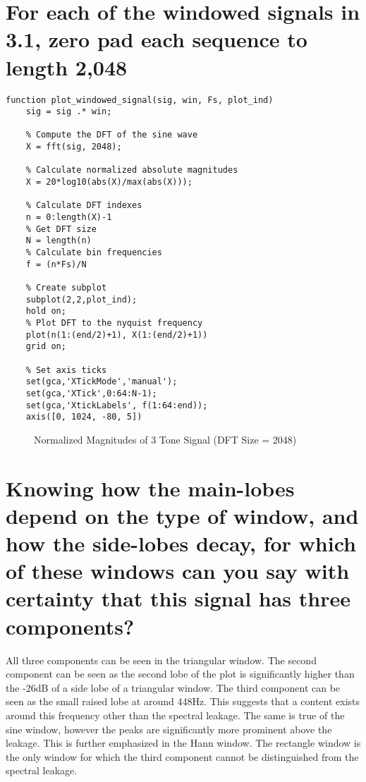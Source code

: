 \documentclass[titlepage]{scrartcl}
\begin{document}
\section{For each of the windowed signals in 3.1, zero pad each sequence to
length 2,048}
\begin{lstlisting}
function plot_windowed_signal(sig, win, Fs, plot_ind)
    sig = sig .* win;
    
    % Compute the DFT of the sine wave
    X = fft(sig, 2048);

    % Calculate normalized absolute magnitudes
    X = 20*log10(abs(X)/max(abs(X)));

    % Calculate DFT indexes
    n = 0:length(X)-1
    % Get DFT size
    N = length(n)
    % Calculate bin frequencies
    f = (n*Fs)/N

    % Create subplot
    subplot(2,2,plot_ind);
    hold on;
    % Plot DFT to the nyquist frequency
    plot(n(1:(end/2)+1), X(1:(end/2)+1))
    grid on;

    % Set axis ticks
    set(gca,'XTickMode','manual');
    set(gca,'XTick',0:64:N-1);
    set(gca,'XtickLabels', f(1:64:end));
    axis([0, 1024, -80, 5])
\end{lstlisting}

\begin{figure}[H]
    \caption{Normalized Magnitudes of 3 Tone Signal (DFT Size = 2048)}
    \label{WindowedSigDFT2048}
\end{figure}

\section{Knowing how the main-lobes depend on the type of window, and how
the side-lobes decay, for which of these windows can you say with
certainty that this signal has three components?}
All three components can be seen in the triangular window. The second component
can be seen as the second lobe of the plot is significantly higher than the
-26dB of a side lobe of a triangular window. The third component can be seen as
the small raised lobe at around 448Hz. This suggests that a content exists
around this frequency other than the spectral leakage. 
The same is true of the sine window, however the peaks are significantly more
prominent above the leakage. This is further emphasized in the Hann window.
The rectangle window is the only window for which the third component cannot be
distinguished from the spectral leakage.
\end{document}
